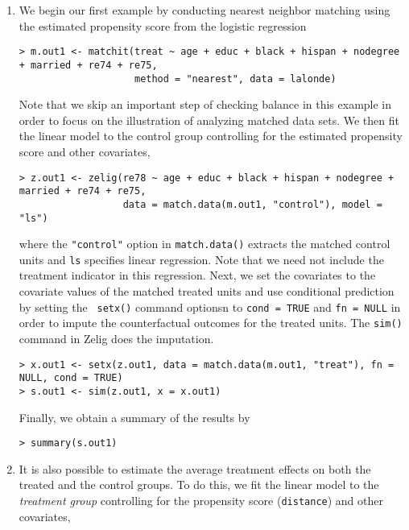 \begin{enumerate}
\item We begin our first example by conducting nearest neighbor
  matching using the estimated propensity score from the logistic
  regression
\begin{verbatim}
> m.out1 <- matchit(treat ~ age + educ + black + hispan + nodegree + married + re74 + re75, 
                    method = "nearest", data = lalonde)
\end{verbatim}
  Note that we skip an important step of checking balance in this
  example in order to focus on the illustration of analyzing matched
  data sets. We then fit the linear model to the control group
  controlling for the estimated propensity score and other covariates,
\begin{verbatim}
> z.out1 <- zelig(re78 ~ age + educ + black + hispan + nodegree + married + re74 + re75, 
                  data = match.data(m.out1, "control"), model = "ls")
\end{verbatim}
  where the {\tt "control"} option in {\tt match.data()} extracts the
  matched control units and {\tt ls} specifies linear regression. Note
  that we need not include the treatment indicator in this regression.
  Next, we set the covariates to the covariate values of the matched
  treated units and use conditional prediction by setting the {\tt
    setx()} command optionsn to {\tt cond = TRUE} and {\tt fn = NULL}
  in order to impute the counterfactual outcomes for the treated
  units. The {\tt sim()} command in Zelig does the imputation.
\begin{verbatim}
> x.out1 <- setx(z.out1, data = match.data(m.out1, "treat"), fn = NULL, cond = TRUE)
> s.out1 <- sim(z.out1, x = x.out1)
\end{verbatim}
Finally, we obtain a summary of the results by 
\begin{verbatim}
> summary(s.out1)
\end{verbatim}

\item It is also possible to estimate the average treatment effects on
  both the treated and the control groups. To do this, we fit the
  linear model to the {\it treatment group} controlling for the
  propensity score ({\tt distance}) and other covariates,


\end{enumerate}
